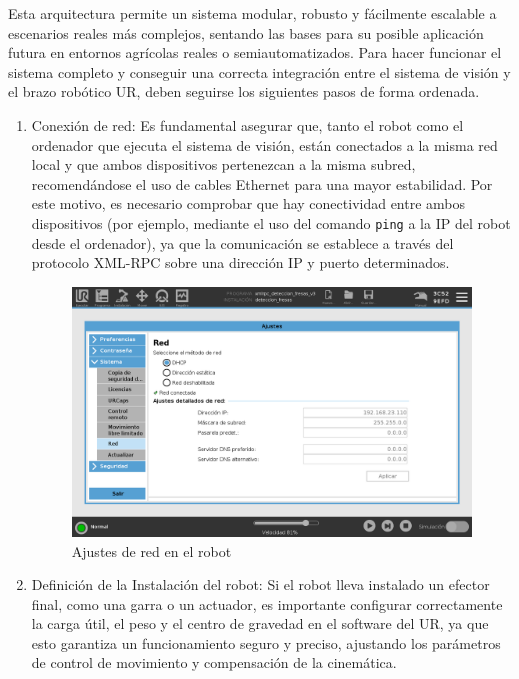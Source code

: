Esta arquitectura permite un sistema modular, robusto y fácilmente escalable a escenarios reales más complejos, sentando las bases para su posible aplicación futura en entornos agrícolas reales o semiautomatizados. Para hacer funcionar el sistema completo y conseguir una correcta integración entre el sistema de visión y el brazo robótico UR, deben seguirse los siguientes pasos de forma ordenada.

\begin{enumerate}
  \item Conexión de red: Es fundamental asegurar que, tanto el robot como el ordenador que ejecuta el sistema de visión, están conectados a la misma red local y que ambos dispositivos pertenezcan a la misma subred, recomendándose el uso de cables Ethernet para una mayor estabilidad. Por este motivo, es necesario comprobar que hay conectividad entre ambos dispositivos (por ejemplo, mediante el uso del comando \texttt{ping} a la IP del robot desde el ordenador), ya que la comunicación se establece a través del protocolo XML-RPC sobre una dirección IP y puerto determinados.
    
      \begin{figure} [H]
        \begin{center}
          \includegraphics[width=155mm]{figs/Ajustes de Red UR.png}
        \end{center}
        \caption{Ajustes de red en el robot}
        \label{fig:ajustes_red_UR}
      \end{figure} 
  
  \item Definición de la Instalación del robot: Si el robot lleva instalado un efector final, como una garra o un actuador, es importante configurar correctamente la carga útil, el peso y el centro de gravedad en el software del UR, ya que esto garantiza un funcionamiento seguro y preciso, ajustando los parámetros de control de movimiento y compensación de la cinemática.
  

\end{enumerate}
